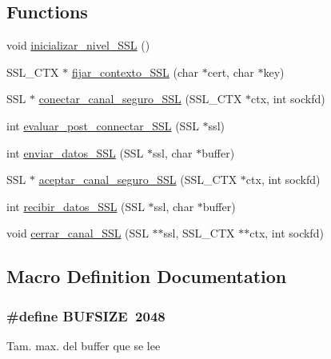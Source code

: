 \subsection*{Functions}
\begin{DoxyCompactItemize}
\item 
void \hyperlink{_g-2361-06-_p3-funciones__ssl_8c_a937108af8fd0832377b084e24172ee41}{inicializar\+\_\+nivel\+\_\+\+S\+SL} ()
\item 
S\+S\+L\+\_\+\+C\+TX $\ast$ \hyperlink{_g-2361-06-_p3-funciones__ssl_8c_a9d58ced0f4bab693b1c8d8b7eabe10a2}{fijar\+\_\+contexto\+\_\+\+S\+SL} (char $\ast$cert, char $\ast$key)
\item 
S\+SL $\ast$ \hyperlink{_g-2361-06-_p3-funciones__ssl_8c_a79add582c01289f85c0a81569ee3b73e}{conectar\+\_\+canal\+\_\+seguro\+\_\+\+S\+SL} (S\+S\+L\+\_\+\+C\+TX $\ast$ctx, int sockfd)
\item 
int \hyperlink{_g-2361-06-_p3-funciones__ssl_8c_ac5f32cf09e3c0efd5cbc25452ed192a9}{evaluar\+\_\+post\+\_\+connectar\+\_\+\+S\+SL} (S\+SL $\ast$ssl)
\item 
int \hyperlink{_g-2361-06-_p3-funciones__ssl_8c_a259d64855c617836e2b18975ee98029a}{enviar\+\_\+datos\+\_\+\+S\+SL} (S\+SL $\ast$ssl, char $\ast$buffer)
\item 
S\+SL $\ast$ \hyperlink{_g-2361-06-_p3-funciones__ssl_8c_aaeb9457077403f2261ca1a86e3802a1d}{aceptar\+\_\+canal\+\_\+seguro\+\_\+\+S\+SL} (S\+S\+L\+\_\+\+C\+TX $\ast$ctx, int sockfd)
\item 
int \hyperlink{_g-2361-06-_p3-funciones__ssl_8c_adc12a32e9564947c310da53ed910d66a}{recibir\+\_\+datos\+\_\+\+S\+SL} (S\+SL $\ast$ssl, char $\ast$buffer)
\item 
void \hyperlink{_g-2361-06-_p3-funciones__ssl_8c_af96fb6c9c2330e21ab617e949acf7a8c}{cerrar\+\_\+canal\+\_\+\+S\+SL} (S\+SL $\ast$$\ast$ssl, S\+S\+L\+\_\+\+C\+TX $\ast$$\ast$ctx, int sockfd)
\end{DoxyCompactItemize}


\subsection{Macro Definition Documentation}
\subsubsection[{\texorpdfstring{B\+U\+F\+S\+I\+ZE}{BUFSIZE}}]{\setlength{\rightskip}{0pt plus 5cm}\#define B\+U\+F\+S\+I\+ZE~2048}\hypertarget{_g-2361-06-_p3-funciones__ssl_8c_aeca034f67218340ecb2261a22c2f3dcd}{}\label{_g-2361-06-_p3-funciones__ssl_8c_aeca034f67218340ecb2261a22c2f3dcd}
Tam. max. del buffer que se lee 

